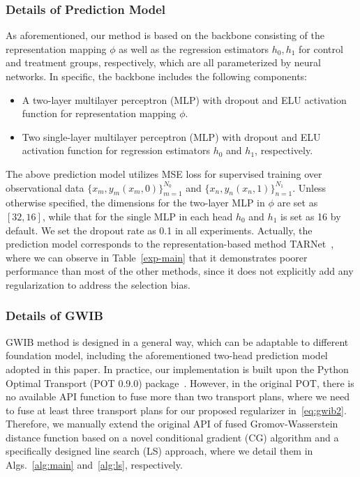 \documentclass{article}
\begin{document}
\subsubsection{Details of Prediction Model}
As aforementioned, our method is based on the backbone consisting of the representation mapping $\phi$ as well as the regression estimators $h_0, h_1$ for control and treatment groups, respectively, which are all parameterized by neural networks.
In specific, the backbone includes the following components:
\begin{itemize}
\item A two-layer multilayer perceptron (MLP) with dropout and ELU activation function for representation mapping $\phi$.
\item Two single-layer multilayer perceptron (MLP) with dropout and ELU activation function for regression estimators $h_0$ and $h_1$, respectively.
\end{itemize}
The above prediction model utilizes MSE loss for supervised training over observational data $\{x_m,y_m(x_m,0)\}_{m=1}^{N_0}$ and $\{x_n,y_n(x_n,1)\}_{n=1}^{N_1}$.
Unless otherwise specified, the dimensions for the two-layer MLP in $\phi$ are set as $\left[32, 16\right]$, while that for the single MLP in each head $h_0$ and $h_1$ is set as 16 by default.
We set the dropout rate as 0.1 in all experiments.
Actually, the prediction model corresponds to the representation-based method TARNet~\cite{shalit2017estimating}, where we can observe in Table~\ref{exp-main} that it demonstrates poorer performance than most of the other methods, since it does not explicitly add any regularization to address the selection bias.

\subsubsection{Details of GWIB}
GWIB method is designed in a general way, which can be adaptable to different foundation model, including the aforementioned two-head prediction model adopted in this paper.
In practice, our implementation is built upon the Python Optimal Transport (POT 0.9.0)  package~\cite{flamary2021pot}.
However, in the original POT, there is no available API function to fuse more than two transport plans, where we need to fuse at least three transport plans for our proposed regularizer in~\eqref{eq:gwib2}.
Therefore, we manually extend the original API of fused Gromov-Wasserstein distance function based on a novel conditional gradient (CG) algorithm and a specifically designed line search (LS) approach, where we detail them in Algs.~\ref{alg:main} and~\ref{alg:ls}, respectively.  
\end{document}

